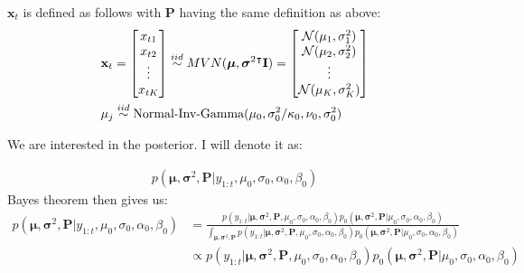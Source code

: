 $\mathbf{x}_t$ is defined as follows with $\mathbf{P}$ having the same definition as above:
\begin{align}
    &\mathbf{x}_t = 
    \begin{bmatrix}
        x_{t1} \\
        x_{t2}\\
        \vdots \\
        x_{tK} \\
    \end{bmatrix}
    \overset{iid}{\sim}
    MVN(\boldsymbol{\mu}, \boldsymbol{\sigma}^2 {}^\intercal \mathbf{I})=
    \begin{bmatrix}
        \mathcal{N}(\mu_1, \sigma^2_1)\\
        \mathcal{N}(\mu_2, \sigma^2_2)\\
        \vdots\\
        \mathcal{N}(\mu_K, \sigma^2_K)\\
    \end{bmatrix}\\
    &\mu_j \overset{iid}{\sim} \text{Normal-Inv-Gamma}(\mu_0, \sigma^2_0/\kappa_0, \nu_0, \sigma^2_0)\\
\end{align}



We are interested in the posterior.
I will denote it as:

\begin{align}
    p(\boldsymbol{\mu}, \boldsymbol{\sigma}^2, \mathbf{P}|y_{1:t}, \mu_0, \sigma_0, \alpha_0, \beta_0)  
\end{align}
Bayes theorem then gives us:
\begin{align}
    p(\boldsymbol{\mu}, \boldsymbol{\sigma}^2, \mathbf{P}|y_{1:t}, \mu_0, \sigma_0, \alpha_0, \beta_0) &=
    \frac{p(y_{1:t} |\boldsymbol{\mu}, \boldsymbol{\sigma}^2, \mathbf{P}, \mu_0, \sigma_0, \alpha_0, \beta_0)
    p_0( \boldsymbol{\mu}, \boldsymbol{\sigma}^2, \mathbf{P}| \mu_0, \sigma_0, \alpha_0, \beta_0)}
    {\int_{\boldsymbol{\mu}, \boldsymbol{\sigma}^2, \mathbf{P}} p(y_{1:t} |\boldsymbol{\mu}, \boldsymbol{\sigma}^2, \mathbf{P}, \mu_0, \sigma_0, \alpha_0, \beta_0)
    p_0( \boldsymbol{\mu}, \boldsymbol{\sigma}^2, \mathbf{P}| \mu_0, \sigma_0, \alpha_0, \beta_0)}\\[10pt]
    &\propto p(y_{1:t} |\boldsymbol{\mu}, \boldsymbol{\sigma}^2, \mathbf{P}, \mu_0, \sigma_0, \alpha_0, \beta_0)
    p_0( \boldsymbol{\mu}, \boldsymbol{\sigma}^2, \mathbf{P}| \mu_0, \sigma_0, \alpha_0, \beta_0)
\end{align}

